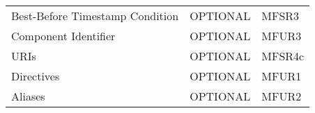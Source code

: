 \documentclass[0-thesis.tex]{subfiles}
\begin{document}
\begin{longtable}[]{@{}lll@{}}
    \begin{minipage}[t]{0.32\columnwidth}\raggedright\strut Best-Before Timestamp
    Condition\strut \end{minipage} &
    \begin{minipage}[t]{0.36\columnwidth}\raggedright\strut OPTIONAL\strut \end{minipage}
    & \begin{minipage}[t]{0.23\columnwidth}\raggedright\strut MFSR3\strut
    \end{minipage}\tabularnewline
    \begin{minipage}[t]{0.32\columnwidth}\raggedright\strut Component Identifier\strut
    \end{minipage} & \begin{minipage}[t]{0.36\columnwidth}\raggedright\strut
    OPTIONAL\strut \end{minipage} &
    \begin{minipage}[t]{0.23\columnwidth}\raggedright\strut MFUR3\strut
    \end{minipage}\tabularnewline
    \begin{minipage}[t]{0.32\columnwidth}\raggedright\strut URIs\strut \end{minipage} &
    \begin{minipage}[t]{0.36\columnwidth}\raggedright\strut OPTIONAL\strut \end{minipage}
    & \begin{minipage}[t]{0.23\columnwidth}\raggedright\strut MFSR4c\strut
    \end{minipage}\tabularnewline
    \begin{minipage}[t]{0.32\columnwidth}\raggedright\strut Directives\strut
    \end{minipage} & \begin{minipage}[t]{0.36\columnwidth}\raggedright\strut
    OPTIONAL\strut \end{minipage} &
    \begin{minipage}[t]{0.23\columnwidth}\raggedright\strut MFUR1\strut
    \end{minipage}\tabularnewline
    \begin{minipage}[t]{0.32\columnwidth}\raggedright\strut Aliases\strut \end{minipage} &
    \begin{minipage}[t]{0.36\columnwidth}\raggedright\strut OPTIONAL\strut \end{minipage}
    & \begin{minipage}[t]{0.23\columnwidth}\raggedright\strut MFUR2\strut

\end{minipage}
\end{longtable}
\end{document}
